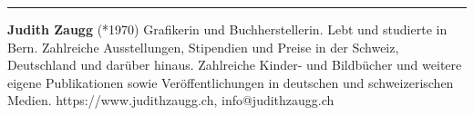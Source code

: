 \begin{center}\rule{0.5\linewidth}{0.5pt}\end{center}

\textbf{Judith Zaugg} (*1970) Grafikerin
und Buchherstellerin. Lebt und studierte in Bern. Zahlreiche
Ausstellungen, Stipendien und Preise in der Schweiz, Deutschland und
darüber hinaus. Zahlreiche Kinder- und Bildbücher und weitere eigene
Publikationen sowie Veröffentlichungen in deutschen und schweizerischen
Medien. https://www.judithzaugg.ch, info@judithzaugg.ch
